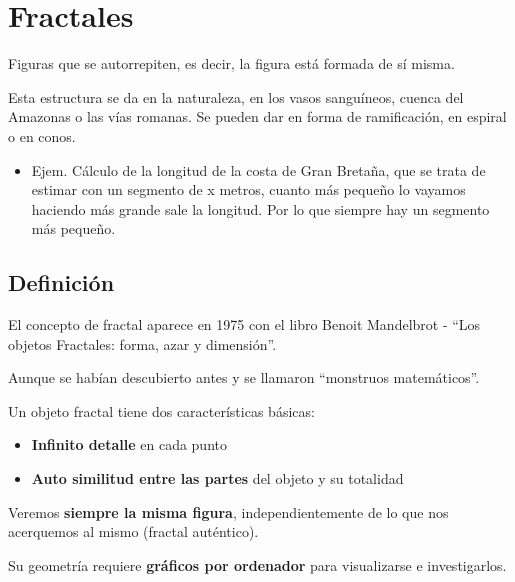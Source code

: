 \chapter{Fractales}
Figuras que se autorrepiten, es decir, la figura está formada de sí misma.

Esta estructura se da en la naturaleza, en los vasos sanguíneos, cuenca del Amazonas o las vías romanas. Se pueden dar en forma de ramificación, en espiral o en conos.
\begin{itemize}
	\item Ejem. Cálculo de la longitud de la costa de Gran Bretaña, que se trata de estimar con un segmento de x metros, cuanto más pequeño lo vayamos haciendo más grande sale la longitud. Por lo que siempre hay un segmento más pequeño.

\end{itemize}

\section{Definición}
El concepto de fractal aparece en 1975 con el libro Benoit Mandelbrot - \enquote{Los objetos Fractales: forma, azar y dimensión}.

Aunque se habían descubierto antes y se llamaron \enquote{monstruos matemáticos}.

Un objeto fractal tiene dos características básicas:
\begin{itemize}
	\item \textbf{Infinito detalle} en cada punto
	\item \textbf{Auto similitud entre las partes} del objeto y su totalidad
\end{itemize}
Veremos \textbf{siempre la misma figura}, independientemente de lo que nos acerquemos al mismo (fractal auténtico).

Su geometría requiere \textbf{gráficos por ordenador} para visualizarse e investigarlos.

